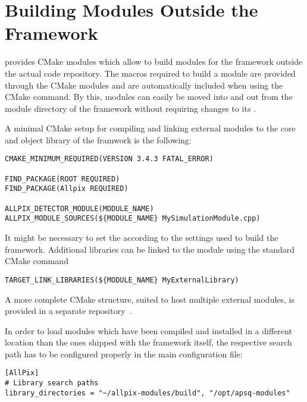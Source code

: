 \section{Building Modules Outside the Framework}

\apsq provides CMake modules which allow to build modules for the framework outside the actual code repository.
The macros required to build a module are provided through the CMake modules and are automatically included when using the  CMake command.
By this, modules can easily be moved into and out from the module directory of the framework without requiring changes to its .

A minimal CMake setup for compiling and linking external modules to the core and object library of the \apsq framwork is the following:

\begin{verbatim}
CMAKE_MINIMUM_REQUIRED(VERSION 3.4.3 FATAL_ERROR)

FIND_PACKAGE(ROOT REQUIRED)
FIND_PACKAGE(Allpix REQUIRED)

ALLPIX_DETECTOR_MODULE(MODULE_NAME)
ALLPIX_MODULE_SOURCES(${MODULE_NAME} MySimulationModule.cpp)
\end{verbatim}

It might be necessary to set the  according to the settings used to build the framework.
Additional libraries can be linked to the module using the standard CMake command
\begin{verbatim}
TARGET_LINK_LIBRARIES(${MODULE_NAME} MyExternalLibrary)
\end{verbatim}

A more complete CMake structure, suited to host multiple external modules, is provided in a separate repository~\cite{ap2-external-modules}.

In order to load modules which have been compiled and installed in a different location than the ones shipped with the framework itself, the respective search path has to be configured properly in the \apsq main configuration file:

\begin{verbatim}
[AllPix]
# Library search paths
library_directories = "~/allpix-modules/build", "/opt/apsq-modules"
\end{verbatim}

